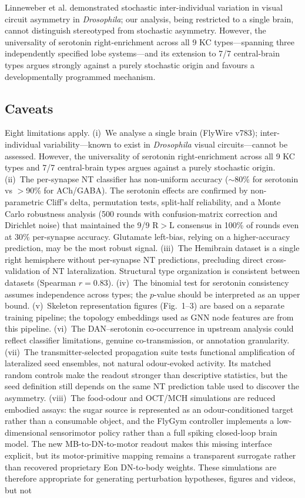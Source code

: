 \documentclass[10pt]{article}
\begin{document}
Linneweber et al.\cite{linneweber2020asymmetry} demonstrated stochastic inter-individual variation in visual circuit asymmetry in \textit{Drosophila}; our analysis, being restricted to a single brain, cannot distinguish stereotyped from stochastic asymmetry. However, the universality of serotonin right-enrichment across all 9 KC types---spanning three independently specified lobe systems---and its extension to 7/7 central-brain types argues strongly against a purely stochastic origin and favours a developmentally programmed mechanism.

\subsection*{Caveats}

Eight limitations apply. (i)~We analyse a single brain (FlyWire v783); inter-individual variability---known to exist in \textit{Drosophila} visual circuits\cite{linneweber2020asymmetry}---cannot be assessed. However, the universality of serotonin right-enrichment across all 9 KC types and 7/7 central-brain types argues against a purely stochastic origin. (ii)~The per-synapse NT classifier has non-uniform accuracy ($\sim$80\% for serotonin vs $>$90\% for ACh/GABA)\cite{eckstein2020neurotransmitter}. The serotonin effects are confirmed by non-parametric Cliff's delta, permutation tests, split-half reliability, and a Monte Carlo robustness analysis (500 rounds with confusion-matrix correction and Dirichlet noise) that maintained the 9/9 R$>$L consensus in 100\% of rounds even at 30\% per-synapse accuracy. Glutamate left-bias, relying on a higher-accuracy prediction, may be the most robust signal. (iii)~The Hemibrain dataset is a single right hemisphere without per-synapse NT predictions, precluding direct cross-validation of NT lateralization. Structural type organization is consistent between datasets (Spearman $r = 0.83$). (iv)~The binomial test for serotonin consistency assumes independence across types; the $p$-value should be interpreted as an upper bound. (v)~Skeleton representation figures (Fig.~1--3) are based on a separate training pipeline; the topology embeddings used as GNN node features are from this pipeline. (vi)~The DAN--serotonin co-occurrence in upstream analysis could reflect classifier limitations, genuine co-transmission, or annotation granularity. (vii)~The transmitter-selected propagation suite tests functional amplification of lateralized seed ensembles, not natural odour-evoked activity. Its matched random controls make the readout stronger than descriptive statistics, but the seed definition still depends on the same NT prediction table used to discover the asymmetry. (viii)~The food-odour and OCT/MCH simulations are reduced embodied assays: the sugar source is represented as an odour-conditioned target rather than a consumable object, and the FlyGym controller implements a low-dimensional sensorimotor policy rather than a full spiking closed-loop brain model. The new MB-to-DN-to-motor readout makes this missing interface explicit, but its motor-primitive mapping remains a transparent surrogate rather than recovered proprietary Eon DN-to-body weights. These simulations are therefore appropriate for generating perturbation hypotheses, figures and videos, but not 
\end{document}
